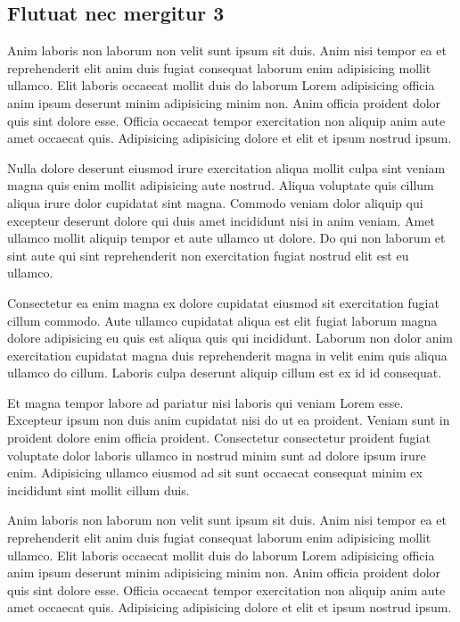 \documentclass[a4paper,10pt,french]{sphinxmanual}
\begin{document}
\subsection{Flutuat nec mergitur 3}
\label{\detokenize{docs/tuts/autocad-tut01:flutuat-nec-mergitur-3}}
Anim laboris non laborum non velit sunt ipsum sit duis. Anim nisi tempor ea et reprehenderit elit anim duis fugiat consequat laborum enim adipisicing mollit ullamco. Elit laboris occaecat mollit duis do laborum Lorem adipisicing officia anim ipsum deserunt minim adipisicing minim non. Anim officia proident dolor quis sint dolore esse. Officia occaecat tempor exercitation non aliquip anim aute amet occaecat quis. Adipisicing adipisicing dolore et elit et ipsum nostrud ipsum.

Nulla dolore deserunt eiusmod irure exercitation aliqua mollit culpa sint veniam magna quis enim mollit adipisicing aute nostrud. Aliqua voluptate quis cillum aliqua irure dolor cupidatat sint magna. Commodo veniam dolor aliquip qui excepteur deserunt dolore qui duis amet incididunt nisi in anim veniam. Amet ullamco mollit aliquip tempor et aute ullamco ut dolore. Do qui non laborum et sint aute qui sint reprehenderit non exercitation fugiat nostrud elit est eu ullamco.

Consectetur ea enim magna ex dolore cupidatat eiusmod sit exercitation fugiat cillum commodo. Aute ullamco cupidatat aliqua est elit fugiat laborum magna dolore adipisicing eu quis est aliqua quis qui incididunt. Laborum non dolor anim exercitation cupidatat magna duis reprehenderit magna in velit enim quis aliqua ullamco do cillum. Laboris culpa deserunt aliquip cillum est ex id id consequat.

Et magna tempor labore ad pariatur nisi laboris qui veniam Lorem esse. Excepteur ipsum non duis anim cupidatat nisi do ut ea proident. Veniam sunt in proident dolore enim officia proident. Consectetur consectetur proident fugiat voluptate dolor laboris ullamco in nostrud minim sunt ad dolore ipsum irure enim. Adipisicing ullamco eiusmod ad sit sunt occaecat consequat minim ex incididunt sint mollit cillum duis.

Anim laboris non laborum non velit sunt ipsum sit duis. Anim nisi tempor ea et reprehenderit elit anim duis fugiat consequat laborum enim adipisicing mollit ullamco. Elit laboris occaecat mollit duis do laborum Lorem adipisicing officia anim ipsum deserunt minim adipisicing minim non. Anim officia proident dolor quis sint dolore esse. Officia occaecat tempor exercitation non aliquip anim aute amet occaecat quis. Adipisicing adipisicing dolore et elit et ipsum nostrud ipsum.
\end{document}

